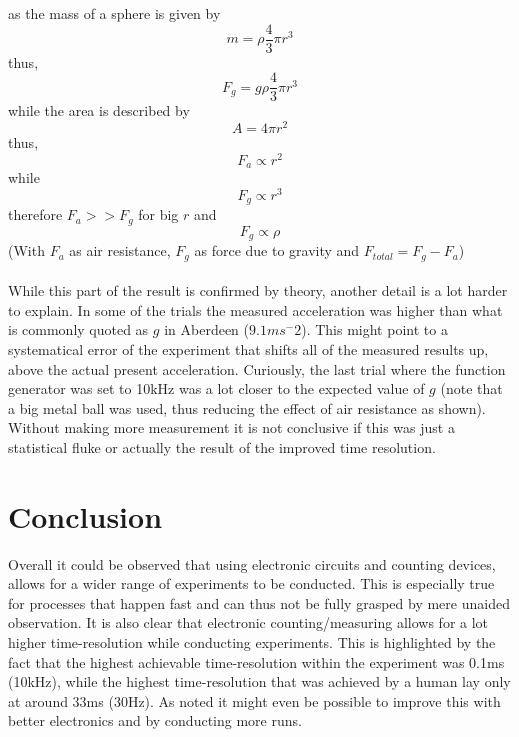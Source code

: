 \documentclass[fleqn,14pt]{article}
\begin{document}
as the mass of a sphere is given by
$$
m = \rho \frac{4}{3} \pi r^3
$$
thus,
$$
F_g = g \rho \frac{4}{3} \pi r^3
$$
while the area is described by
$$
A =  4 \pi r^2
$$
thus,
$$
F_a \propto r^2
$$
while
$$
F_g \propto r^3
$$
therefore $F_a >> F_g$ for big $r$
and
$$
F_g \propto \rho
$$
(With $F_a$ as air resistance, $F_g$ as force due to gravity and
$F_{total} = F_g - F_a$)\\
\\
While this part of the result is confirmed by theory, another detail is a lot harder to explain. In some
of the trials the measured acceleration was higher than what is commonly quoted as $g$ in Aberdeen ($9.1ms^-2$).
This might point to a systematical error of the experiment that shifts all of the measured results up, above
the actual present acceleration. Curiously, the last trial where the function generator was set to 10kHz was
a lot closer to the expected value of $g$ (note that a big metal ball was used, thus reducing the effect of 
air resistance as shown). Without making more measurement it is not conclusive if this was just a statistical
fluke or actually the result of the improved time resolution.

\section{Conclusion}
Overall it could be observed that using electronic circuits and counting devices, allows for a wider range
of experiments to be conducted. This is especially true for processes that happen fast and can thus not
be fully grasped by mere unaided observation. It is also clear that electronic counting/measuring allows
for a lot higher time-resolution while conducting experiments. This is highlighted by the fact that the
highest achievable time-resolution within the experiment was 0.1ms (10kHz), while the highest time-resolution
that was achieved by a human lay only at around 33ms (30Hz). As noted it might even be possible to improve
this with better electronics and by conducting more runs.

\printbibliography
\end{document}
